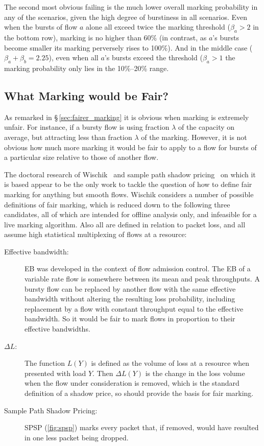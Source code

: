 The second most obvious failing is the much lower overall marking probability in any of the scenarios, given the high degree of burstiness in all scenarios. Even when the bursts of flow \(a\) alone all exceed twice the marking threshold (\(\beta_a>2\) in the bottom row), marking is no higher than 60\% (in contrast, as  \(a\)'s bursts become smaller its marking perversely rises to 100\%). And in the middle case (\(\beta_a+\beta_b=2.25\)), even when all \(a\)'s bursts exceed the threshold (\(\beta_a>1\) the marking probability only lies in the 10\%--20\% range.

\subsection{What Marking would be Fair?}\label{sec:marking_fairness_definition}

As remarked in \S\,\ref{sec:fairer_marking} it is obvious when marking is extremely unfair. For instance, if a bursty flow is using fraction \(\lambda\) of the capacity on average, but attracting less than fraction \(\lambda\) of the marking. However, it is not obvious how much more marking it would be fair to apply to a flow for bursts of a particular size relative to those of another flow.

The doctoral research of Wischik~\cite{Wischik99:Mark_Fairly, Wischik99:Large_Dev_PhD} and sample path shadow pricing~\cite{Kelly98:Shadow_prices_prop_fair} on which it is based appear to be the only work to tackle the question of how to define fair marking for anything but smooth flows. Wischik considers a number of possible definitions of fair marking, which is reduced down to the following three candidates, all of which are intended for offline analysis only, and infeasible for a live marking algorithm. Also all are defined in relation to packet loss, and all assume high statistical multiplexing of flows at a resource:
\begin{description}
	\item[Effective bandwidth:] EB was developed in the context of flow admission control. The EB of a variable rate flow is somewhere between its mean and peak throughputs. A bursty flow can be replaced by another flow with the same effective bandwidth without altering the resulting loss probability, including replacement by a flow with constant throughput equal to the effective bandwidth. So it would be fair to mark flows in proportion to their effective bandwidths.
	\item[\boldmath\(\Delta{L}\):] The function \(L(Y)\) is defined as the volume of loss at a resource when presented with load \(Y\). Then \(\Delta{L(Y)}\) is the change in the loss volume when the flow under consideration is removed, which is the standard definition of a shadow price, so should provide the basis for fair marking. 
	\item[Sample Path Shadow Pricing:] SPSP (\autoref{fig:spsp}) marks every packet that, if removed, would have resulted in one less packet being dropped.
\end{description}

